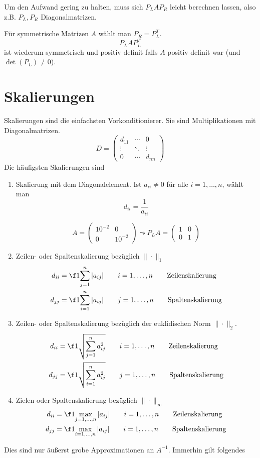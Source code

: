 \documentclass{mycourse}
\begin{document}
Um den Aufwand gering zu halten, muss sich $P_LAP_R$ leicht berechnen lassen, also z.B. $P_L,P_R$ Diagonalmatrizen.

Für symmetrische Matrizen $A$ wählt man $P_R=P_L^T$.
\[
	P_LAP_L^T
\]
ist wiederum symmetrisch und positiv definit falls $A$ positiv definit war (und $\det(P_L)\neq 0$).


\section{Skalierungen}


Skalierungen sind die einfachsten Vorkonditionierer.
Sie sind Multiplikationen mit Diagonalmatrizen.
\[
	D=\begin{pmatrix}
		d_{11} & \cdots & 0\\
		\vdots & \ddots & \vdots\\
		0 & \cdots & d_{nn}
	\end{pmatrix}
\]
Die häufigsten Skalierungen sind
\begin{enumerate}
	\item
		Skalierung mit dem Diagonalelement.
		Ist $a_{ii}\neq 0$ für alle $i=1,\dotsc,n$, wählt man
		\[
			d_{ii}=\frac 1{a_{ii}}
		\]
		\begin{note}
			\[
			A = \begin{pmatrix}10^{-2} & 0 \\ 0 & 10^{-2}\end{pmatrix} 
			\leadsto P_LA = \begin{pmatrix}1&0\\0&1\end{pmatrix}
			\]
		\end{note}
	\item
		Zeilen- oder Spaltenskalierung bezüglich $\|\cdot\|_1$
		\begin{align*}
			d_{ii} &= \f 1{\sum_{j=1}^n |a_{ij}|} \qquad i=1,\dotsc,n \qquad \text{Zeilenskalierung}\\
			d_{jj} &= \f 1{\sum_{i=1}^n |a_{ij}|} \qquad j=1,\dotsc,n \qquad \text{Spaltenskalierung}
		\end{align*}
	\item
		Zeilen- oder Spaltenskalierung bezüglich der euklidischen Norm $\|\cdot\|_2$.
		\begin{align*}
			d_{ii}&=\f 1{\sqrt{\sum_{j=1}^n a_{ij}^2}} \qquad i=1,\dotsc,n \qquad \text{Zeilenskalierung}\\
			d_{jj}&=\f 1{\sqrt{\sum_{i=1}^n a_{ij}^2}} \qquad j=1,\dotsc,n \qquad \text{Spaltenskalierung}
		\end{align*}
	\item
		Zielen oder Spaltenskalierung bezüglich $\|\cdot\|_\infty$
		\begin{align*}
			d_{ii}&=\f 1{\max_{j=1,\dotsc,n}|a_{ij}|} \qquad i=1,\dotsc,n \qquad \text{Zeilenskalierung}\\
			d_{jj}&=\f 1{\max_{i=1,\dotsc,n}|a_{ij}|} \qquad i=1,\dotsc,n \qquad \text{Spaltenskalierung}
		\end{align*}
\end{enumerate}
Dies sind nur äußerst grobe Approximationen an $A^{-1}$.
Immerhin gilt folgendes
\end{document}
